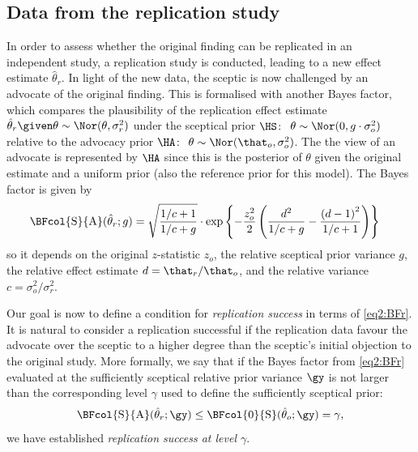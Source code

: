 \subsection{Data from the replication study}
\label{sec2:bfr}
In order to assess whether the original finding can be replicated in an
independent study, a replication study is conducted, leading to a new effect
estimate $\hat{\theta}_r$. In light of the new data, the sceptic is now
challenged by an advocate of the original finding. This is formalised with
another Bayes factor, which compares the plausibility of the replication effect
estimate $\hat{\theta}_r \given \theta \sim \Nor(\theta, \sigma^2_r)$ under the
sceptical prior $\HS \colon$ $\theta \sim \Nor(0, g \cdot \sigma^2_o)$ relative
to the advocacy prior $\HA \colon$ $\theta \sim \Nor(\that_o, \sigma^2_o)$. The
the view of an advocate is represented by $\HA$ since this is the posterior of
$\theta$ given the original estimate and a uniform prior (also the reference
prior for this model). The Bayes factor is given by
\begin{align}
  \label{eq2:BFr}
  \BFcol{\mathrm{S}}{\mathrm{A}}(\hat{\theta}_r; g)
  &= \sqrt{\frac{1/c + 1}{1/c + g}} \cdot
  \exp\left\{-\frac{z_o^2}{2}\left(\frac{d^2}{1/c + g} -
  \frac{\left(d - 1\right)^2}{1/c + 1} \right)\right\}
\end{align}
so it depends on the original $z$-statistic $z_o$, the relative sceptical prior
variance $g$, the relative effect estimate $d = \that_r/\that_o$, and the
relative variance $c = \sigma^2_o/\sigma^2_r$.

Our goal is now to define a condition for \emph{replication success} in terms of
\eqref{eq2:BFr}. It is natural to consider a replication successful if the
replication data favour the advocate over the sceptic to a higher degree than
the sceptic's initial objection to the original study. More formally, we say
that if the Bayes factor from \eqref{eq2:BFr} evaluated at the sufficiently
sceptical relative prior variance $\gy$ is not larger than the corresponding
level $\gamma$ used to define the sufficiently sceptical prior:
\begin{align}
  \label{eq2:success}
  \BFcol{\mathrm{S}}{\mathrm{A}}(\hat{\theta}_r; \gy)
  \leq \BFcol{0}{\mathrm{S}}(\hat{\theta}_o; \gy) =\gamma,
\end{align}
we have established \emph{replication success at level $\gamma$}.


